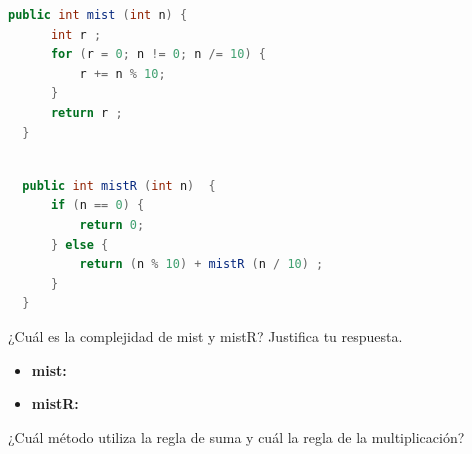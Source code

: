 \documentclass{report}
\begin{document}
\begin{enumerate}
\begin{lstlisting}[language=Java, caption=mist]
  public int mist (int n) {
      int r ;
      for (r = 0; n != 0; n /= 10) {
          r += n % 10;
      }
      return r ;
  }
            \end{lstlisting}
           
            \begin{lstlisting}[language=Java, caption=mistR]
            
  public int mistR (int n)  {
      if (n == 0) {
          return 0;
      } else {
          return (n % 10) + mistR (n / 10) ;
      }
  }
            \end{lstlisting}

        \newline ¿Cuál es la complejidad de mist y mistR? Justifica tu respuesta.
        \begin{itemize}
            \item \textbf{mist: }
            \item \textbf{mistR: } 
        \end{itemize}
        \newline ¿Cuál método utiliza la regla de suma y cuál la regla de la multiplicación?
    \end{enumerate}
\end{document}
